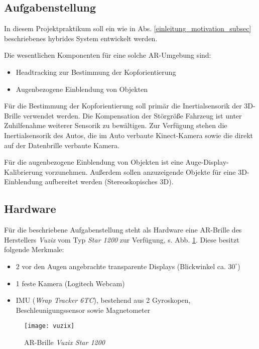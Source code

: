 \subsection{Aufgabenstellung}
\label{einleitung_aufgabenstellung_subsec}


In diesem Projektpraktikum soll ein wie in Abs. \ref{einleitung_motivation_subsec} beschriebenes hybrides System entwickelt werden.

Die wesentlichen Komponenten für eine solche \ac{AR}-Umgebung sind:
\begin{itemize}
  \item Headtracking zur Bestimmung der Kopforientierung
  \item Augenbezogene Einblendung von Objekten
\end{itemize}

Für die Bestimmung der Kopforientierung soll primär die Inertialsensorik der 3D-Brille verwendet werden.
Die Kompensation der Störgröße Fahrzeug ist unter Zuhilfenahme weiterer Sensorik zu bewältigen.
Zur Verfügung stehen die Inertialsensorik des Autos, die im Auto verbaute Kinect-Kamera sowie die direkt auf der Datenbrille verbaute Kamera.

Für die augenbezogene Einblendung von Objekten ist eine Auge-Display-Kalibrierung vorzunehmen.
Außerdem sollen anzuzeigende Objekte für eine 3D-Einblendung aufbereitet werden (Stereoskopisches 3D).





\subsection{Hardware}
\label{einleitung_hardware_subsec}

Für die beschriebene Aufgabenstellung steht als Hardware eine \ac{AR}-Brille des Herstellers \emph{Vuzix} vom Typ \emph{Star 1200} zur Verfügung, s. Abb. \ref{fig:vuzix_star_1200}.
Diese besitzt folgende Merkmale:
\begin{itemize}
  \item 2 vor den Augen angebrachte transparente Displays (Blickwinkel ca. $30^\circ$)
  \item 1 feste Kamera (Logitech Webcam)
  \item \ac{IMU} (\emph{Wrap Tracker 6TC}), bestehend aus 2 Gyroskopen, Beschleunigungssensor sowie Magnetometer
\end{itemize}

\begin{figure}[h]
  \centering
  \texttt{[image: vuzix]}
  \caption{\ac{AR}-Brille \emph{Vuzix Star 1200}\ \cite{vuzix}}
  \label{fig:vuzix_star_1200}
\end{figure}
